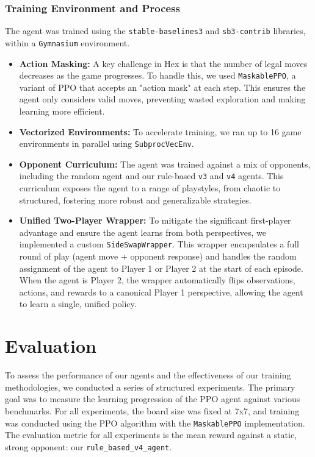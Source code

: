 \documentclass[conference]{IEEEtran}
\begin{document}

\subsubsection{Training Environment and Process}
The agent was trained using the \texttt{stable-baselines3} \cite{b2} and \texttt{sb3-contrib} libraries, within a \texttt{Gymnasium} \cite{b3} environment.
\begin{itemize}
    \item \textbf{Action Masking:} A key challenge in Hex is that the number of legal moves decreases as the game progresses. To handle this, we used \texttt{MaskablePPO}, a variant of PPO that accepts an "action mask" at each step. This ensures the agent only considers valid moves, preventing wasted exploration and making learning more efficient.
    \item \textbf{Vectorized Environments:} To accelerate training, we ran up to 16 game environments in parallel using \texttt{SubprocVecEnv}.
    \item \textbf{Opponent Curriculum:} The agent was trained against a mix of opponents, including the random agent and our rule-based \texttt{v3} and \texttt{v4} agents. This curriculum exposes the agent to a range of playstyles, from chaotic to structured, fostering more robust and generalizable strategies.
    \item \textbf{Unified Two-Player Wrapper:} To mitigate the significant first-player advantage and ensure the agent learns from both perspectives, we implemented a custom \texttt{SideSwapWrapper}. This wrapper encapsulates a full round of play (agent move + opponent response) and handles the random assignment of the agent to Player 1 or Player 2 at the start of each episode. When the agent is Player 2, the wrapper automatically flips observations, actions, and rewards to a canonical Player 1 perspective, allowing the agent to learn a single, unified policy.
\end{itemize}

\section{Evaluation}
To assess the performance of our agents and the effectiveness of our training methodologies, we conducted a series of structured experiments. The primary goal was to measure the learning progression of the PPO agent against various benchmarks. For all experiments, the board size was fixed at 7x7, and training was conducted using the PPO algorithm with the \texttt{MaskablePPO} implementation. The evaluation metric for all experiments is the mean reward against a static, strong opponent: our \texttt{rule\_based\_v4\_agent}.
\end{document}
